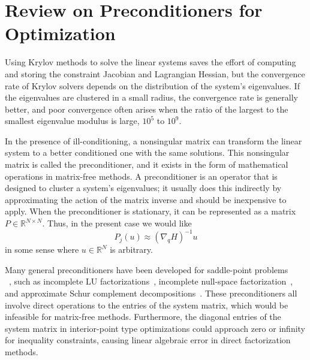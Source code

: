\section{Review on Preconditioners for Optimization}\label{2:krylov:pc}
Using Krylov methods to solve the linear systems saves the effort of computing and storing the constraint Jacobian and Lagrangian Hessian, but the convergence rate of Krylov solvers depends on the distribution 
of the system's eigenvalues. If the eigenvalues are clustered in a small radius, the convergence rate is 
generally better, and poor convergence often arises 
when the ratio of the largest to the smallest eigenvalue modulus is large, \eg $10^5$ to $10^9$. 


In the presence of ill-conditioning, a nonsingular matrix can transform the linear system to a better conditioned one with the same solutions. This nonsingular matrix is called the preconditioner, and it exists in the form of mathematical operations in matrix-free methods. 
A preconditioner is an operator that is designed to cluster a system's eigenvalues;  
it usually does this indirectly by approximating the action of the matrix inverse and should be inexpensive to apply.  When the preconditioner is stationary, it can be represented as a matrix $P \in \mathbb{R}^{N\times N}$.  Thus, in the present case we would like
\begin{equation*}
P_j(u) \approx (\nabla_q H)^{-1}u                        %
\end{equation*}
in some sense where $u \in \mathbb{R}^{N}$ is arbitrary. 


Many general preconditioners have been developed for saddle-point 
problems\\~\cite{benzi2005numerical}, such as incomplete LU factorizations~\cite{BENZI2002418, NLA:NLA320, saad:2003}, incomplete null-space factorization~\cite{nullspace_precond, 2015arXiv151106845L}, and approximate Schur complement decompositions~\cite{Bergamaschi2004, DBLP:journals/corr/LiXS15}. 
These preconditioners all involve direct operations to the entries of the system matrix, which would be infeasible for matrix-free methods. Furthermore, the diagonal entries of the system matrix in interior-point type optimizations could approach zero or infinity for inequality constraints, causing linear algebraic error in direct factorization methods. 

